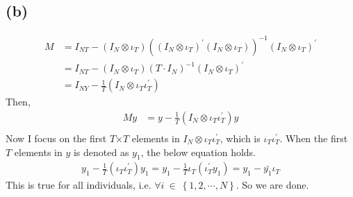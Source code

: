 \documentclass{article}
\begin{document}
\subsection{(b)}
\begin{align*}
	M &= I_{NT} - \left( I_N \otimes \iota_T \right) \left( \left( I_N \otimes \iota_T \right)^{'} \left( I_N \otimes \iota_T \right) \right)^{-1} \left( I_N \otimes \iota_T \right)^{'}\\[8pt]
	&= I_{NT} - \left( I_N \otimes \iota_T \right)(T\cdot I_N)^{-1} \left( I_N \otimes \iota_T \right)^{'}\\[8pt]
	&= I_{NY} - \frac{1}{T}\left( I_N \otimes \iota_T\iota_T^{'}\right)
\end{align*}
Then,
\begin{align*}
	My &= y - \frac{1}{T}\left( I_N \otimes \iota_T\iota_T^{'}\right)y\\[8pt]
\end{align*}
Now I focus on the first $T$×$T$ elements in $I_N \otimes \iota_T\iota_T^{'}$, which is $\iota_T\iota_T^{'}$. When the first $T$ elements in
$y$ is denoted as $y_1$, the below equation holds.
\begin{align*}
	y_1 - \frac{1}{T} \left( \iota_T\iota_T^{'}\right) y_1 = y_1 - \frac{1}{T} \iota_T \left( \iota_T^{'} y_1 \right) = y_1 - \bar{y_1} \iota_T
\end{align*}
This is true for all individuals, i.e. $\forall i\ \in\ \left\{ 1,2,\cdots,N \right\}$. So we are done.
\end{document}
